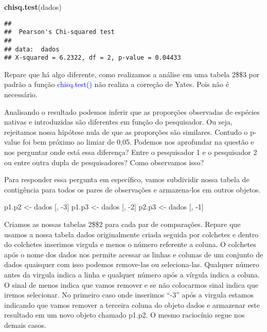 \documentclass[titlepage, oneside, openany, a4paper]{book}
\newenvironment{Shaded}{\begin{snugshade}}{\end{snugshade}}
\newcommand{\DecValTok}[1]{\textcolor[rgb]{0.00,0.00,0.81}{#1}}
\newcommand{\KeywordTok}[1]{\textcolor[rgb]{0.13,0.29,0.53}{\textbf{#1}}}
\newcommand{\NormalTok}[1]{#1}
\newcommand{\StringTok}[1]{\textcolor[rgb]{0.31,0.60,0.02}{#1}}
\begin{document}
\begin{Shaded}
\begin{Highlighting}[]
\KeywordTok{chisq.test}\NormalTok{(dados)}
\end{Highlighting}
\end{Shaded}

\begin{verbatim}
## 
##  Pearson's Chi-squared test
## 
## data:  dados
## X-squared = 6.2322, df = 2, p-value = 0.04433
\end{verbatim}

Repare que há algo diferente, como realizamos a análise em uma tabela 2\$\times\$3 por padrão a função \textcolor{blue}{chisq.test()} não realiza a correção de Yates. Pois não é necessário.

Analisando o resultado podemos inferir que as proporções observadas de espécies nativas e introduzidas são diferentes em função do pesquisador. Ou seja, rejeitamos nossa hipótese nula de que as proporções são similares. Contudo o p-value foi bem próximo ao limiar de 0,05. Podemos nos aprofundar na questão e nos perguntar onde está essa diferença? Entre o pesquisador 1 e o pesquisador 2 ou entre outra dupla de pesquisadores? Como observamos isso?

Para responder essa pergunta em específico, vamos subdividir nossa tabela de contigência para todos os pares de observações e armazena-los em outros objetos.

\begin{Shaded}
\begin{Highlighting}[]
\NormalTok{p1.p2 <-}\StringTok{ }\NormalTok{dados [, }\DecValTok{-3}\NormalTok{]}
\NormalTok{p1.p3 <-}\StringTok{ }\NormalTok{dados [, }\DecValTok{-2}\NormalTok{]}
\NormalTok{p2.p3 <-}\StringTok{ }\NormalTok{dados [, }\DecValTok{-1}\NormalTok{]}
\end{Highlighting}
\end{Shaded}

Criamos as nossas tabelas 2\$\times\$2 para cada par de comparações. Repare que usamos a nossa tabela dados originalmente criada seguida por colchetes e dentro do colchetes inserimos virgula e menos o número referente a coluna. O colchetes após o nome dos dados nos permite acessar as linhas e colunas de um conjunto de dados quaisquer com isso podemos remove-las ou seleciona-las. Qualquer número antes da virgula indica a linha e qualquer número após a vírgula indica a coluna. O sinal de menos indica que vamos remover e se não colocarmos sinal indica que iremos selecionar. No primeiro caso onde inserimos ``-3'' após a virgula estamos indicando que vamos remover a terceira coluna do objeto dados e armazenar este resultado em um novo objeto chamado p1.p2. O mesmo raciocínio segue nos demais casos.
\end{document}
